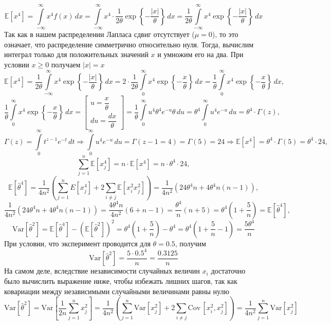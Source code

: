 \documentclass[a4paper, 12pt]{article}
\begin{document}
    $$\mathbb{E}\left[x^4\right]=\int\limits_{-\infty}^{\infty}x^4f(x)\,dx=\int\limits_{-\infty}^{\infty}x^4\cdot\dfrac{1}{2\theta}\exp{\left\{-\dfrac{|x|}{\theta}\right\}}\,dx=\dfrac{1}{2\theta}\int\limits_{-\infty}^{\infty}x^4\exp{\left\{-\dfrac{|x|}{\theta}\right\}}\,dx$$
    Так как в нашем распределении Лапласа сдвиг отсутствует ($\mu=0$), то это означает, что распределение симметрично относительно нуля. Тогда, вычислим интеграл только для
    положительных значений $x$ и умножим его на два. При условии $x\geq0$ получаем $|x|=x$
    $$\mathbb{E}\left[x^4\right]=\dfrac{1}{2\theta}\int\limits_{-\infty}^{\infty}x^4\exp{\left\{-\dfrac{|x|}{\theta}\right\}}\,dx=2\cdot\dfrac{1}{2\theta}\int\limits_{0}^{\infty}x^4\exp{\left\{-\dfrac{x}{\theta}\right\}}\,dx=
    \dfrac{1}{\theta}\int\limits_{0}^{\infty}x^4\exp{\left\{-\dfrac{x}{\theta}\right\}}\,dx,$$
    $$\dfrac{1}{\theta}\int\limits_{0}^{\infty}x^4\exp{\left\{-\dfrac{x}{\theta}\right\}}\,dx=
    \begin{bmatrix}
        u=\dfrac{x}{\theta}\\
        du=\dfrac{dx}{\theta}
    \end{bmatrix}=
    \dfrac{1}{\theta}\int\limits_{0}^{\infty}u^4\theta^4e^{-u}\theta\,du=\theta^4\int\limits_{0}^{\infty}u^4e^{-u}\,du=\theta^4\cdot\Gamma{(z)},$$
    $$\Gamma{(z)}=\int\limits_{0}^{\infty}t^{z-1}e^{-t}\,dt\Rightarrow\int\limits_{0}^{\infty}u^4e^{-u}\,du=\Gamma{(z-1=4)}=\Gamma{(5)}=24\Rightarrow\mathbb{E}\left[x^4\right]=\theta^4\cdot\Gamma{(5)}=\theta^4\cdot24,$$
    $$\sum\limits_{j=1}^{n}\mathbb{E}\left[x_j^4\right]=n\cdot\mathbb{E}\left[x^4\right]=n\cdot\theta^4\cdot24,$$
    $$\mathbb{E}\left[\hat{\theta}^4\right]=\dfrac{1}{4n^2}\left(\sum\limits_{j=1}^{n}E\left[x_j^4\right]+2\sum\limits_{i\neq{j}}\mathbb{E}\left[x_i^2x_j^2\right]\right)=
    \dfrac{1}{4n^2}\left(24\theta^4n+4\theta^4n\left(n-1\right)\right),$$
    $$\dfrac{1}{4n^2}\left(24\theta^4n+4\theta^4n\left(n-1\right)\right)=\dfrac{4\theta^4n}{4n^2}\left(6+n-1\right)=\dfrac{\theta^4}{n}\left(n+5\right)=\theta^4\left(1+\dfrac{5}{n}\right)=\mathbb{E}\left[\hat{\theta}^4\right],$$
    $$\text{Var}{\left[\hat{\theta}^2\right]}=\mathbb{E}\left[\hat{\theta}^4\right]-\left(\mathbb{E}\left[\hat{\theta}^2\right]\right)^2=
    \theta^4\left(1+\dfrac{5}{n}\right)-\theta^4=\theta^4\left(1+\dfrac{5}{n}-1\right)=\dfrac{5\theta^4}{n}$$
    При условии, что эксперимент проводится для $\theta=0.5$, получим
    $$\text{Var}{\left[\hat{\theta}^2\right]}=\dfrac{5\cdot0.5^4}{n}=\dfrac{0.3125}{n}$$
    На самом деле, вследствие независимости случайных величин $x_i$ достаточно было вычислить выражение ниже, чтобы избежать лишних шагов, так как ковариации между независимыми случайными величинами равны нулю
    $$\text{Var}{\left[\hat{\theta}^2\right]}=\text{Var}{\left[\dfrac{1}{2n}\sum\limits_{j=1}^{n}x_j^2\right]}=\dfrac{1}{4n^2}\left(\sum\limits_{j=1}^{n}\text{Var}\left[x_{j}^2\right]+2\sum\limits_{i\neq{j}}\text{Cov}\,\left[x_i^2,x_j^2\right]\right)=\dfrac{1}{4n^2}\sum\limits_{j=1}^{n}\text{Var}\left[x_{j}^2\right]$$
\end{document}
